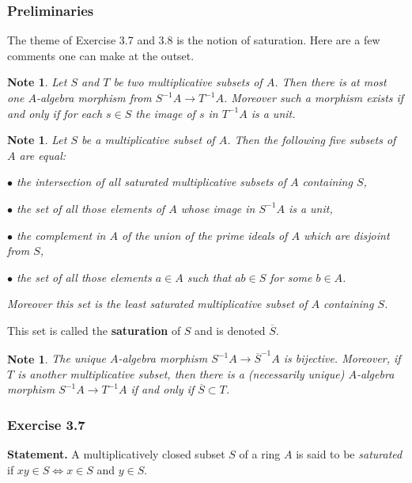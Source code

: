 \documentclass[parskip=half,fontsize=12pt]{scrartcl}%
\newtheorem{note}[thm]{Note}
\begin{document}
\subsubsection{Preliminaries}\label{satprel}

The theme of Exercise 3.7 and 3.8 is the notion of saturation. Here are a few comments one can make at the outset.

\begin{note}%
Let $S$ and $T$ be two multiplicative subsets of $A$. Then there is at most one $A$-algebra morphism from $S^{-1}A\to T^{-1}A$. Moreover such a morphism exists if and only if for each $s\in S$ the image of $s$ in $T^{-1}A$ is a unit.
\end{note}

\begin{note}%
Let $S$ be a multiplicative subset of $A$. Then the following five subsets of $A$ are equal:

$\bullet$ the intersection of all saturated multiplicative subsets of $A$ containing $S$,

$\bullet$ the set of all those elements of $A$ whose image in $S^{-1}A$ is a unit,

$\bullet$ the complement in $A$ of the union of the prime ideals of $A$ which are disjoint from $S$,

$\bullet$ the set of all those elements $a\in A$ such that $ab\in S$ for some $b\in A$.

Moreover this set is the least saturated multiplicative subset of $A$ containing $S$.
\end{note}

This set is called the \textbf{saturation} of $S$ and is denoted $\overline S$.

\begin{note}%
The unique $A$-algebra morphism $S^{-1}A\to\overline S^{-1}A$ is bijective. Moreover, if $T$ is another multiplicative subset, then there is a (necessarily unique) $A$-algebra morphism $S^{-1}A\to T^{-1}A$ if and only if $\overline S\subset T$.
\end{note}

\subsubsection{Exercise 3.7}

\textbf{Statement.} A multiplicatively closed subset $S$ of a ring $A$ is said to be \emph{saturated} if $xy\in S\iff x\in S$ and $y\in S$. 
\end{document}
